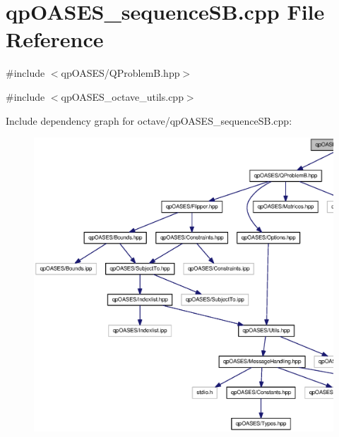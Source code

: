 \section{qpOASES\_\-sequenceSB.cpp File Reference}
\label{octave_2qpOASES__sequenceSB_8cpp}
{\ttfamily \#include $<$qpOASES/QProblemB.hpp$>$}\par
{\ttfamily \#include $<$qpOASES\_\-octave\_\-utils.cpp$>$}\par
Include dependency graph for octave/qpOASES\_\-sequenceSB.cpp:
\nopagebreak
\begin{figure}[H]
\begin{center}
\leavevmode
\includegraphics[width=400pt]{octave_2qpOASES__sequenceSB_8cpp__incl}
\end{center}
\end{figure}
